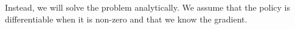 \documentclass[a4paper]{article}
\begin{document}
Instead, we will solve the problem analytically. We assume that the policy is differentiable when it is non-zero and that we know the gradient.


\end{document}
